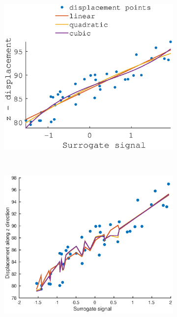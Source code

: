 \documentclass[11pt,a4paper,oneside]{report}
\begin{document}
\begin{figure}[H]
    \hspace*{-2em}
  \begin{subfigure}[b]{0.33\textwidth}
    \includegraphics[width=\textwidth, trim=0 0 0 110,clip=true]{figures/task2/fit_round1_couch4.eps}
  \end{subfigure}%
    ~ %
  \begin{subfigure}[b]{0.33\textwidth}
    \includegraphics[width=\textwidth, trim=0 0 0 110,clip=true]{figures/task2/fit_round2_couch4.eps}

\end{subfigure}
\end{figure}
\end{document}
